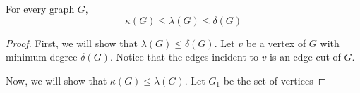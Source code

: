 \begin{theorem}
  For every graph \(G\), 
  \begin{displaymath}
    \kappa(G) \leq \lambda(G) \leq \delta(G)
  \end{displaymath}
\end{theorem}

\begin{proof}
  First, we will show that \(\lambda(G) \leq \delta(G)\). Let
  \(v\) be a vertex of \(G\) with minimum degree \(\delta(G)\).
  Notice that the edges incident to \(v\) is an edge cut of
  \(G\).

  Now, we will show that \(\kappa(G) \leq \lambda(G)\). Let
  \(G_1\) be the set of vertices
\end{proof}

